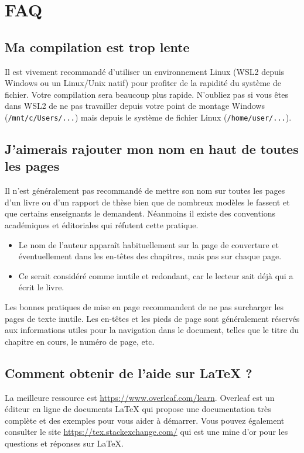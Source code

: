 \chapter{FAQ}

\section{Ma compilation est trop lente}

Il est vivement recommandé d'utiliser un environnement Linux (WSL2 depuis Windows ou un Linux/Unix natif) pour profiter de la rapidité du système de fichier. Votre compilation sera beaucoup plus rapide. N'oubliez pas si vous êtes dans WSL2 de ne pas travailler depuis votre point de montage Windows (\verb!/mnt/c/Users/...!) mais depuis le système de fichier Linux (\verb!/home/user/...!).

\section{J'aimerais rajouter mon nom en haut de toutes les pages}

Il n'est généralement pas recommandé de mettre son nom sur toutes les pages d'un livre ou d'un rapport de thèse bien que de nombreux modèles le fassent et que certains enseignants le demandent. Néanmoins il existe des conventions académiques et éditoriales qui réfutent cette pratique.

\begin{itemize}
    \item Le nom de l'auteur apparaît habituellement sur la page de couverture et éventuellement dans les en-têtes des chapitres, mais pas sur chaque page.
    \item Ce serait considéré comme inutile et redondant, car le lecteur sait déjà qui a écrit le livre.
\end{itemize}

Les bonnes pratiques de mise en page recommandent de ne pas surcharger les pages de texte inutile. Les en-têtes et les pieds de page sont généralement réservés aux informations utiles pour la navigation dans le document, telles que le titre du chapitre en cours, le numéro de page, etc.

\section{Comment obtenir de l'aide sur LaTeX ?}

La meilleure ressource est \url{https://www.overleaf.com/learn}. Overleaf est un éditeur en ligne de documents LaTeX qui propose une documentation très complète et des exemples pour vous aider à démarrer. Vous pouvez également consulter le site \url{https://tex.stackexchange.com/} qui est une mine d'or pour les questions et réponses sur LaTeX.

